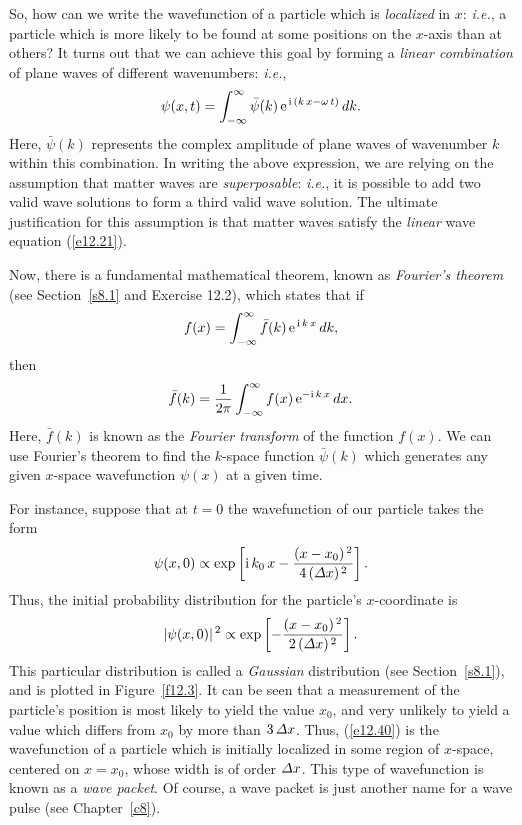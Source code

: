So, how can we write the wavefunction of a particle which is {\em localized}\/
in $x$: {\em i.e.}, a particle which is more likely to be found at some
positions on the $x$-axis than at others? It turns out that we can achieve this goal by forming
a {\em linear combination}\/ of plane waves of different wavenumbers:
{\em i.e.}, 
\begin{equation}\label{e12.37}
\psi(x,t) = \int_{-\infty}^{\infty} \bar{\psi}(k)\,{\rm e}^{\,{\rm i}\,(k\,x-\omega\,t)}\,dk.
\end{equation}
Here, $\bar{\psi}(k)$ represents the complex amplitude of plane waves of wavenumber $k$ within this combination. In writing the above expression,
we are relying on the assumption that matter waves are  {\em superposable}:
{\em i.e.}, it is possible to add two valid wave solutions to form a third valid wave solution.
The ultimate justification for this assumption is that matter waves
satisfy the {\em linear}\/ wave equation (\ref{e12.21}).

Now, there is a fundamental mathematical theorem, known as {\em Fourier's theorem}\/  (see Section~\ref{s8.1} and Exercise 12.2), which states that if
\begin{equation}\label{e12.38}
f(x) = \int_{-\infty}^{\infty} \bar{f}(k)\,{\rm e}^{\,{\rm i}\,k\,x}\,dk,
\end{equation}
then
\begin{equation}\label{e12.39}
\bar{f}(k) = \frac{1}{2\pi}\int_{-\infty}^\infty f(x)\,{\rm e}^{-{\rm i}\,k\,x}\,dx.
\end{equation}
Here, $\bar{f}(k)$ is known as the {\em Fourier transform}\/ of the
function $f(x)$. We can use Fourier's theorem to find the $k$-space function $\bar{\psi}(k)$ which generates any given $x$-space wavefunction $\psi(x)$
at a given time.

For instance, suppose that at $t=0$ the wavefunction of our particle takes the
form
\begin{equation}\label{e12.40}
\psi(x,0) \propto \exp\left[{\rm i}\,k_0\,x - \frac{(x-x_0)^{\,2}}{4\,({\mit\Delta}x)^{\,2}}\right].
\end{equation}
Thus, the initial probability distribution for the particle's $x$-coordinate is 
\begin{equation}\label{e12.41}
|\psi(x,0)|^{\,2} \propto \exp\left[- \frac{(x-x_0)^{\,2}}{2\,({\mit\Delta}x)^{\,2}}\right].
\end{equation}
This particular  distribution is called a {\em Gaussian}\/ distribution (see Section~\ref{s8.1}), and is plotted in Figure~\ref{f12.3}. 
It can be seen that a measurement of the particle's position is most
likely to yield the value $x_0$, and  very
unlikely to yield a value which differs from $x_0$ by more than
$3\,{\mit\Delta} x$. Thus, (\ref{e12.40}) is the wavefunction of a particle
which is initially localized  in some region of $x$-space, centered  on $x=x_0$, whose width is
of order ${\mit\Delta} x$. This type of wavefunction is
known as a {\em wave packet}. Of course, a wave packet is just another name for a wave pulse (see Chapter~\ref{c8}).

